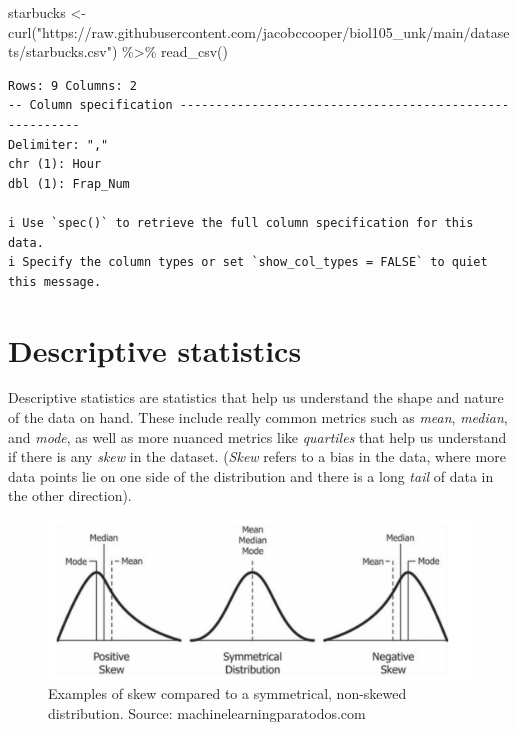 \documentclass[
  letterpaper,
  DIV=11,
  numbers=noendperiod]{scrreprt}
\newenvironment{Shaded}{\begin{snugshade}}{\end{snugshade}}
\newcommand{\FunctionTok}[1]{\textcolor[rgb]{0.28,0.35,0.67}{#1}}
\newcommand{\NormalTok}[1]{\textcolor[rgb]{0.00,0.23,0.31}{#1}}
\newcommand{\OtherTok}[1]{\textcolor[rgb]{0.00,0.23,0.31}{#1}}
\newcommand{\SpecialCharTok}[1]{\textcolor[rgb]{0.37,0.37,0.37}{#1}}
\newcommand{\StringTok}[1]{\textcolor[rgb]{0.13,0.47,0.30}{#1}}
\begin{document}
\begin{Shaded}
\begin{Highlighting}[]
\NormalTok{starbucks }\OtherTok{\textless{}{-}} \FunctionTok{curl}\NormalTok{(}\StringTok{"https://raw.githubusercontent.com/jacobccooper/biol105\_unk/main/datasets/starbucks.csv"}\NormalTok{) }\SpecialCharTok{\%\textgreater{}\%}
  \FunctionTok{read\_csv}\NormalTok{()}
\end{Highlighting}
\end{Shaded}

\begin{verbatim}
Rows: 9 Columns: 2
-- Column specification --------------------------------------------------------
Delimiter: ","
chr (1): Hour
dbl (1): Frap_Num

i Use `spec()` to retrieve the full column specification for this data.
i Specify the column types or set `show_col_types = FALSE` to quiet this message.
\end{verbatim}

\section{Descriptive statistics}\label{descriptive-statistics-1}

Descriptive statistics are statistics that help us understand the shape
and nature of the data on hand. These include really common metrics such
as \emph{mean}, \emph{median}, and \emph{mode}, as well as more nuanced
metrics like \emph{quartiles} that help us understand if there is any
\emph{skew} in the dataset. (\emph{Skew} refers to a bias in the data,
where more data points lie on one side of the distribution and there is
a long \emph{tail} of data in the other direction).

\begin{figure}[H]

{\centering \includegraphics{images/skew.png}

}

\caption{Examples of skew compared to a symmetrical, non-skewed
distribution. Source: machinelearningparatodos.com}

\end{figure}%
\end{document}
